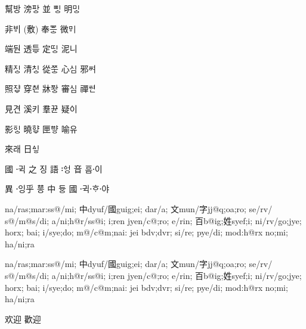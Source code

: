 {\oldjamo
幫바ᇰ 滂파ᇰ 並 삐ᇰ 明미ᇰ

非ᄫᅵ (敷)  奉ᄬᅳᇰ 微ᄝᅵ

端둰 透트ᇢ 定띠ᇰ 泥니

精ᅎᅵᇰ 清ᅔᅵᇰ 從ᅏᅮᇰ 心ᄼᅵᆷ 邪ᄽᅧ

照ᅐᅣᇢ 穿ᅕᆑᆫ 牀ᅑᅪᇰ 審ᄾᅵᆷ 禪ᄿᅧᆫ

見견 溪키 羣뀬 疑ᅌᅵ

影ᅙᅵᇰ 曉햐ᇢ 匣ᅘᅣᇹ 喻유

來래 日ᅀᅵᇹ
}

{\oldjamo
國 귁〮 之 징 語 ᅌᅥᆼ〯 音 ᅙᅳᆷ이〮 \par
異 잉〮乎 ᅘᅩᆼ 中 듀ᇰ 國 귁〮ᄒᆞ〮야〮}
    
\ifXeTeX
\oldjamo
\begin{jamotext}
    na/ras;mar:ss@/mi;
    中dyuf/國guig;ei; dar/a;
    文mun/字jj@q;oa;ro; se/rv/ s@/m@s/di; a/ni;h@r/ss@i;
    i;ren jyen/c@;ro; e/rin; 百b@ig;姓syef;i;
    ni/rv/go;jye; horx; bai; i/sye;do;
    m@/c@m;nai: jei bdv;dvr; si/re; pye/di; mod:h@rx no;mi; ha/ni;ra
\end{jamotext}
\fi

\ifLuaTeX
\begin{jamotext}
        na/ras;mar:ss@/mi;
        中dyuf/國guig;ei; dar/a;
        文mun/字jj@q;oa;ro; se/rv/ s@/m@s/di; a/ni;h@r/ss@i;
        i;ren jyen/c@;ro; e/rin; 百b@ig;姓syef;i;
        ni/rv/go;jye; horx; bai; i/sye;do;
        m@/c@m;nai: jei bdv;dvr; si/re; pye/di; mod:h@rx no;mi; ha/ni;ra

        欢迎  歡迎
\end{jamotext}
\fi